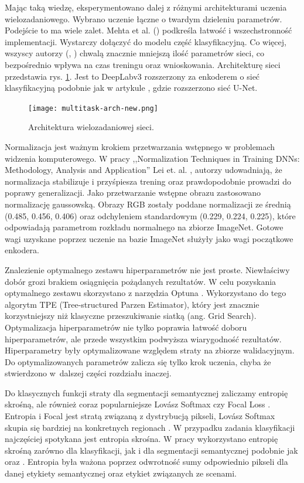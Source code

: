 Mając taką wiedzę, eksperymentowano dalej z różnymi architekturami uczenia wielozadaniowego. Wybrano uczenie łączne o twardym dzieleniu parametrów. Podejście to ma wiele zalet. Mehta et al. (\cite{mehta2018net}) podkreśla łatwość i wszechstronność implementacji. Wystarczy dołączyć do modelu część klasyfikacyjną. Co więcej, wszyscy autorzy (\cite{mehta2018net}, \cite{9892852}) chwalą znacznie mniejszą ilość parametrów sieci, co bezpośrednio wpływa na czas treningu oraz wnioskowania. Architekturę sieci przedstawia rys. \ref{fig:multitask}. Jest to DeepLabv3 rozszerzony za enkoderem o sieć klasyfikacyjną podobnie jak w artykule \cite{mehta2018net}, gdzie rozszerzono sieć U-Net.

\begin{figure}[ht!]
\centering
\texttt{[image: multitask-arch-new.png]}
\caption{Architektura wielozadaniowej sieci.}
\label{fig:multitask}
\end{figure}

Normalizacja jest ważnym krokiem przetwarzania wstępnego w problemach widzenia komputerowego. W pracy ,,Normalization Techniques in Training DNNs: Methodology, Analysis and Application'' Lei et. al. \cite{huang2020normalization}, autorzy udowadniają, że normalizacja stabilizuje i przyśpiesza trening oraz prawdopodobnie prowadzi do poprawy generalizacji. Jako przetwarzanie wstępne obrazu zastosowano normalizację gaussowską. Obrazy RGB zostały poddane normalizacji ze średnią (0.485, 0.456, 0.406) oraz odchyleniem standardowym (0.229, 0.224, 0.225), które odpowiadają parametrom rozkładu normalnego na zbiorze ImageNet. Gotowe wagi uzyskane poprzez uczenie na bazie ImageNet służyły jako wagi początkowe enkodera.

Znalezienie optymalnego zestawu hiperparametrów nie jest proste. Niewłaściwy dobór grozi brakiem osiągnięcia pożądanych rezultatów. W celu pozyskania optymalnego zestawu skorzystano z narzędzia Optuna \cite{optuna_2019}. Wykorzystano do tego algorytm TPE (Tree-structured Parzen Estimator), który jest znacznie korzystniejszy niż klasyczne przeszukiwanie siatką (ang. Grid Search). Optymalizacja hiperparametrów nie tylko poprawia łatwość doboru hiperparametrów, ale przede wszystkim podwyższa wiarygodność rezultatów. Hiperparametry były optymalizowane względem straty na zbiorze walidacyjnym. Do optymalizowanych parametrów zalicza się tylko krok uczenia, chyba że stwierdzono w~dalszej części rozdziału inaczej.

Do klasycznych funkcji straty dla segmentacji semantycznej zaliczamy entropię skrośną, ale również coraz popularniejsze Lov\'asz Softmax \cite{berman2018lovasz} czy Focal Loss \cite{jadon2020survey}. Entropia i Focal jest stratą związaną z dystrybucją pikseli, Lov\'asz Softmax skupia się bardziej na konkretnych regionach \cite{jadon2020survey}. W przypadku zadania klasyfikacji najczęściej spotykana jest entropia skrośna. W pracy wykorzystano entropię skrośną zarówno dla klasyfikacji, jak i dla segmentacji semantycznej podobnie jak \cite{mehta2018net} oraz \cite{9892852}. Entropia była ważona poprzez odwrotność sumy odpowiednio pikseli dla danej etykiety semantycznej oraz etykiet związanych ze scenami.


